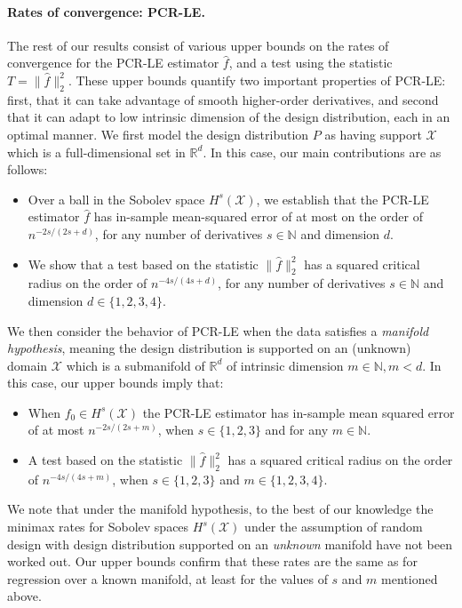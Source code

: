 \documentclass{article}
\theoremstyle{definition}
\def\R{\mathbb{R}}
\newcommand{\wh}[1]{\widehat{#1}}
\newcommand{\mc}[1]{\mathcal{#1}}
\newcommand{\Reals}{\mathbb{R}} %
\newcommand{\Rd}{\Reals^d}
\newcommand{\1}{\mathbf{1}}
\begin{document}
	\paragraph{Rates of convergence: PCR-LE.}
	The rest of our results consist of various upper bounds on the rates of convergence for the PCR-LE estimator $\wh{f}$, and a test using the statistic $T = \|\wh{f}\|_2^2$. These upper bounds quantify two important properties of PCR-LE: first, that it can take advantage of smooth higher-order derivatives, and second that it can adapt to low intrinsic dimension of the design distribution, each in an optimal manner. We first model the design distribution $P$ as having support $\mc{X}$ which is a full-dimensional set in $\Rd$. In this case, our main contributions are as follows:
	\begin{itemize}
		\item  Over a ball in the Sobolev space $H^{s}(\mc{X})$, we establish that the PCR-LE estimator $\wh{f}$ has in-sample mean-squared error of at most on the order of $n^{-2s/(2s + d)}$, for any number of derivatives $s \in \mathbb{N}$ and dimension $d$. 
		\item We show that a test based on the statistic $\|\wh{f}\|_2^2$ has a squared critical radius on the order of $n^{-4s/(4s + d)}$, for any number of derivatives $s \in \mathbb{N}$ and dimension $d \in \{1,2,3,4\}$. 
	\end{itemize}
	We then consider the behavior of PCR-LE when the data satisfies a \emph{manifold hypothesis}, meaning the design distribution is supported on an (unknown) domain $\mc{X}$ which is a submanifold of $\Rd$ of intrinsic dimension $m \in \mathbb{N}, m < d$. In this case, our upper bounds imply that:
	\begin{itemize}
		\item When $f_0 \in H^s(\mc{X})$ the PCR-LE estimator has in-sample mean squared error of at most $n^{-2s/(2s + m)}$, when $s \in \{1,2,3\}$ and for any $m \in \mathbb{N}$. 
		\item A test based on the statistic $\|\wh{f}\|_2^2$ has a squared critical radius on the order of $n^{-4s/(4s + m)}$, when $s \in \{1,2,3\}$ and $m \in \{1,2,3,4\}$.
	\end{itemize}
	We note that under the manifold hypothesis, to the best of our knowledge the minimax rates for Sobolev spaces $H^s(\mc{X})$ under the assumption of random design with design distribution supported on an \emph{unknown} manifold have not been worked out. Our upper bounds confirm that these rates are the same as for regression over a known manifold, at least for the values of $s$ and $m$ mentioned above.
	
\end{document}
